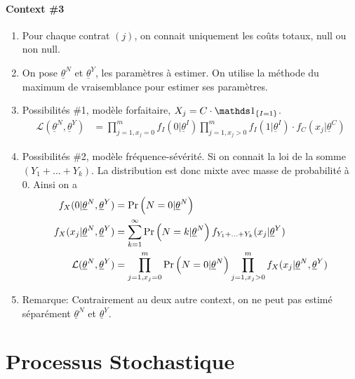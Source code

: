 \paragraph{Context \#3}
\begin{enumerate}[label=(\arabic*)]
    \item Pour chaque contrat $(j)$, on connait uniquement les coûts totaux, null ou non null.
    \item On pose $\underline{\theta}^N$ et $\underline{\theta}^Y$, les paramètres à estimer. On utilise la méthode du maximum de vraisemblance pour estimer ses paramètres. 
    \item Possibilités \#1, modèle forfaitaire, $X_j = C \cdot \indic{I=1}$.
        \begin{align*}
            \mathcal{L}(\underline{\theta}^N,\underline{\theta}^Y) &= \prod_{j=1,x_j=0}^m f_I(0|\underline{\theta}^I) \prod_{j=1,x_j>0}^m f_I(1|\underline{\theta}^I) \cdot f_C(x_j|\underline{\theta}^C) 
        \end{align*}
    \item Possibilités \#2, modèle fréquence-sévérité. Si on connait la loi de la somme $(Y_1+...+Y_k)$. La distribution est donc mixte avec masse de probabilité à 0. Ainsi on a
    \begin{align*}
        f_X(0|\underline{\theta}^N,\underline{\theta}^Y) &= \Pr \left( N=0|\underline{\theta}^N \right) \\
        f_X(x_j|\underline{\theta}^N,\underline{\theta}^Y) &= \sum_{k=1}^\infty \Pr \left( N=k|\underline{\theta}^N \right) f_{Y_1+...+Y_k}(x_j|\underline{\theta}^Y) \\
        \mathcal{L}(\underline{\theta}^N,\underline{\theta}^Y) &= \prod_{j=1,x_j=0}^m \Pr \left( N=0|\underline{\theta}^N \right) \prod_{j=1,x_j>0}^m f_X(x_j|\underline{\theta}^N,\underline{\theta}^Y)
    \end{align*}
    \item Remarque: Contrairement au deux autre context, on ne peut pas estimé séparément $\underline{\theta}^N$ et $\underline{\theta}^Y$.
\end{enumerate}

\section{Processus Stochastique}


